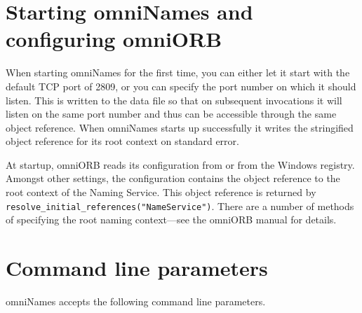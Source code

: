 \documentclass[draft,a4paper,11pt,twoside]{article}
\newcommand{\code}[1]{\texttt{#1}}
\newcommand{\file}{\begingroup \urlstyle{tt}\Url}
\begin{document}
\section{Starting omniNames and configuring omniORB}

When starting omniNames for the first time, you can either let it
start with the default TCP port of 2809, or you can specify the port
number on which it should listen.  This is written to the data file so
that on subsequent invocations it will listen on the same port number
and thus can be accessible through the same object reference.  When
omniNames starts up successfully it writes the stringified object
reference for its root context on standard error.

At startup, omniORB reads its configuration from \file{omniORB.cfg} or
from the Windows registry. Amongst other settings, the configuration
contains the object reference to the root context of the Naming
Service.  This object reference is returned by
\code{resolve\_initial\_references("NameService")}. There are a number
of methods of specifying the root naming context---see the omniORB
manual for details.

\section{Command line parameters}

omniNames accepts the following command line parameters.

\vspace{\baselineskip}
\end{document}
